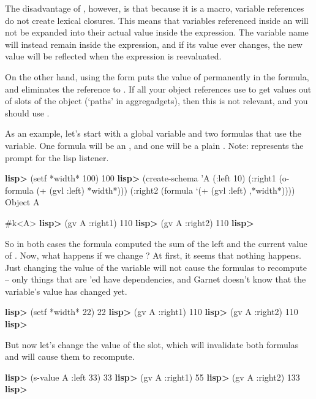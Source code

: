 The disadvantage of , however, is that because it is a macro,
variable references do not create lexical closures.  This means that
variables referenced inside an  will not be expanded into their
actual value inside the expression.  The variable name will instead remain
inside the expression, and if its value ever changes, the new value will
be reflected when the expression is reevaluated.

On the other hand, using the form 
puts the value of  permanently in the formula, and eliminates
the reference to .  If all your object references use
 to get values out of slots of the object (`paths'
in aggregadgets), then this is not relevant, and you should use
.

As an example, let's start with a global variable and two formulas that use
the variable.  One formula will be an , and one will be a plain
.  Note:  represents the prompt for the lisp listener.

\begin{programexample}
{\bf lisp>} (setf *width* 100)
100
{\bf lisp>} (create-schema 'A
	 (:left 10)
         (:right1 (o-formula (+ (gvl :left) *width*)))
	 (:right2 (formula `(+ (gvl :left) ,*width*))))
Object A

#k<A>
{\bf lisp>} (gv A :right1)
110
{\bf lisp>} (gv A :right2)
110
{\bf lisp>}
\end{programexample}

So in both cases the formula computed the sum of the left and the current
value of .  Now, what happens if we change ?  At first,
it seems that nothing happens.  Just changing the value of the variable will
not cause the formulas to recompute -- only things that are 'ed have
dependencies, and Garnet doesn't know that the variable's value has changed
yet.

\begin{programexample}
{\bf lisp>} (setf *width* 22)
22
{\bf lisp>} (gv A :right1)
110
{\bf lisp>} (gv A :right2)
110
{\bf lisp>}
\end{programexample}

But now let's change the value of the  slot, which will invalidate
both formulas and will cause them to recompute.

\begin{programexample}
{\bf lisp>} (s-value A :left 33)
33
{\bf lisp>} (gv A :right1)
55
{\bf lisp>} (gv A :right2)
133
{\bf lisp>}
\end{programexample}

